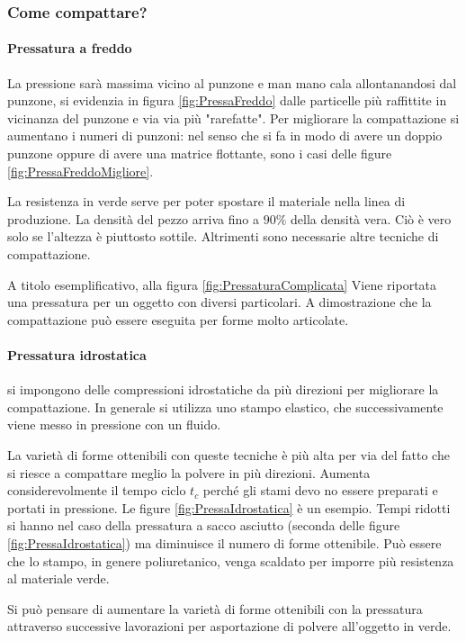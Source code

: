 \subsubsection{Come compattare?}
\paragraph{Pressatura a freddo}
La pressione sarà massima vicino al punzone e man mano cala allontanandosi dal punzone, si evidenzia in figura \ref{fig:PressaFreddo} dalle particelle più raffittite in vicinanza del punzone e via via più "rarefatte".
Per migliorare la compattazione si aumentano i numeri di punzoni: nel senso che si fa in modo di avere un doppio punzone oppure di avere una matrice flottante, sono i casi delle figure \ref{fig:PressaFreddoMigliore}.

La resistenza in verde serve per poter spostare il materiale nella linea di produzione.
La densità del pezzo arriva fino a $90\%$ della densità vera. Ciò è vero solo se l'altezza è piuttosto sottile. Altrimenti sono necessarie altre tecniche di compattazione.

A titolo esemplificativo, alla figura \ref{fig:PressaturaComplicata} Viene riportata una pressatura per un oggetto con diversi particolari.
A dimostrazione che la compattazione può essere eseguita per forme molto articolate.

\paragraph{Pressatura idrostatica}
si impongono delle compressioni idrostatiche da più direzioni per migliorare la compattazione.
In generale si utilizza uno stampo elastico, che successivamente viene messo in pressione con un fluido.

La varietà di forme ottenibili con queste tecniche è più alta per via del fatto che si riesce a compattare meglio la polvere in più direzioni.
Aumenta considerevolmente il tempo ciclo $t_c$ perché gli stami devo no essere preparati e portati in pressione. Le figure \ref{fig:PressaIdrostatica} è un esempio.
Tempi ridotti si hanno nel caso della pressatura a sacco asciutto (seconda delle figure \ref{fig:PressaIdrostatica}) ma diminuisce il numero di forme ottenibile.
Può essere che lo stampo, in genere poliuretanico, venga scaldato per imporre più resistenza al materiale verde.

Si può pensare di aumentare la varietà di forme ottenibili con la pressatura attraverso successive lavorazioni per asportazione di polvere all'oggetto in verde.

